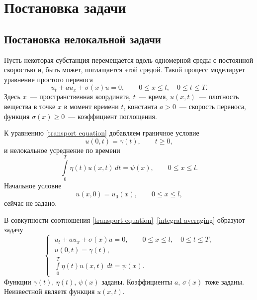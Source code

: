 \documentclass{article}
\renewcommand{\le}{\leqslant}
\renewcommand{\ge}{\geqslant}
\theoremstyle{definition}
\begin{document}
\newpage

\section{Постановка задачи}

\subsection{Постановка нелокальной задачи}
Пусть некоторая субстанция перемещается вдоль одномерной среды с постоянной скоростью и, быть может, поглащается этой средой.
Такой процесс моделирует уравнение простого переноса
\begin{equation} \label{transport equation}
	u_t + au_x + \sigma(x)u = 0, \qquad 0 \le x \le l, \quad 0 \le t \le T.
\end{equation}
Здесь $x$~--- пространственная координата, $t$~--- время, $u(x,t)$~--- плотность вещества в точке $x$ в момент времени $t$, 
константа $ a > 0 $~--- скорость переноса, функция $ \sigma(x) \ge 0 $~--- коэффициент поглощения.

К уравнению \eqref{transport equation} добавляем граничное условие
\begin{equation} \label{boundary condition}
	u(0,t) = \gamma(t), \qquad t \ge 0,
\end{equation}
 и нелокальное усреднение по времени
\begin{equation} \label{integral averaging}
	\int\limits_{0}^{T} \eta(t) u(x, t)\,dt = \psi(x), 	\qquad 0 \le x \le l.
\end{equation}
Начальное условие 
\begin{equation*}
	u(x,0) = u_0(x), \qquad 0 \le x \le l,
\end{equation*}
сейчас не задано.

В совкупности соотношения \eqref{transport equation}--\eqref{integral averaging} образуют задачу
\begin{equation} \label{nonlocal problem}
\begin{cases}
	\; u_t + au_x + \sigma(x)u = 0, \qquad 0 \le x \le l, \quad 0 \le t \le T, \\[3mm]
	\; u(0,t) = \gamma(t), \\[1mm]
	\; \int\limits_{0}^{T} \eta(t) u(x,t)\,dt = \psi(x).
\end{cases}
\end{equation}
Функции $ \gamma(t), \, \eta(t), \, \psi(x)$ заданы.
Коэффициенты $ a, \, \sigma(x)$ тоже заданы. 
Неизвестной являетя функция $ u(x,t) $.
\end{document}
